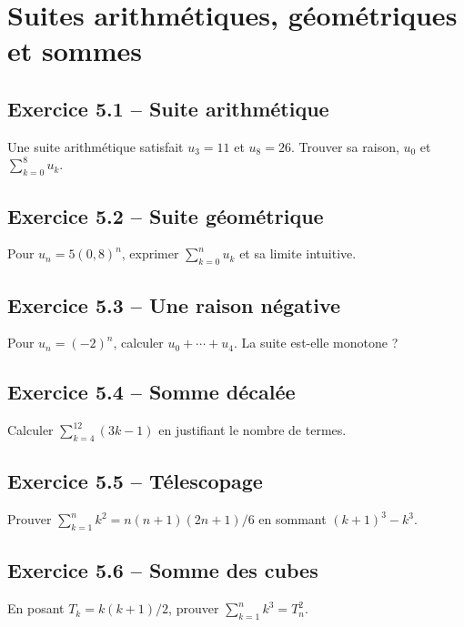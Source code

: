\chapter{Suites arithmétiques, géométriques et sommes}
\section*{Exercice 5.1 -- Suite arithmétique}
Une suite arithmétique satisfait $u_3=11$ et $u_8=26$. Trouver sa raison, $u_0$ et $\sum_{k=0}^8u_k$.

\section*{Exercice 5.2 -- Suite géométrique}
Pour $u_n=5(0{,}8)^n$, exprimer $\sum_{k=0}^{n}u_k$ et sa limite intuitive.

\section*{Exercice 5.3 -- Une raison négative}
Pour $u_n=(-2)^n$, calculer $u_0+\cdots+u_4$. La suite est-elle monotone ?

\section*{Exercice 5.4 -- Somme décalée}
Calculer $\sum_{k=4}^{12}(3k-1)$ en justifiant le nombre de termes.

\section*{Exercice 5.5 -- Télescopage}
Prouver $\sum_{k=1}^n k^2=n(n+1)(2n+1)/6$ en sommant $(k+1)^3-k^3$.

\section*{Exercice 5.6 -- Somme des cubes}
En posant $T_k=k(k+1)/2$, prouver $\sum_{k=1}^nk^3=T_n^2$.
